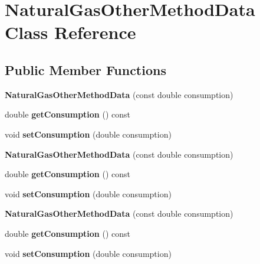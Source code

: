 \hypertarget{class_natural_gas_other_method_data}{}\section{Natural\+Gas\+Other\+Method\+Data Class Reference}
\label{class_natural_gas_other_method_data}
\subsection*{Public Member Functions}
\begin{DoxyCompactItemize}
\item 
\mbox{\label{class_natural_gas_other_method_data_a4f8900809b13ad64b7d67638e5d671a0}} 
{\bfseries Natural\+Gas\+Other\+Method\+Data} (const double consumption)
\item 
\mbox{\label{class_natural_gas_other_method_data_acbe484318bc5c104a7de9361b7930a84}} 
double {\bfseries get\+Consumption} () const
\item 
\mbox{\label{class_natural_gas_other_method_data_a9ca02c802cfa36f72a99dbc62fbc60bb}} 
void {\bfseries set\+Consumption} (double consumption)
\item 
\mbox{\label{class_natural_gas_other_method_data_a4f8900809b13ad64b7d67638e5d671a0}} 
{\bfseries Natural\+Gas\+Other\+Method\+Data} (const double consumption)
\item 
\mbox{\label{class_natural_gas_other_method_data_acbe484318bc5c104a7de9361b7930a84}} 
double {\bfseries get\+Consumption} () const
\item 
\mbox{\label{class_natural_gas_other_method_data_a9ca02c802cfa36f72a99dbc62fbc60bb}} 
void {\bfseries set\+Consumption} (double consumption)
\item 
\mbox{\label{class_natural_gas_other_method_data_a4f8900809b13ad64b7d67638e5d671a0}} 
{\bfseries Natural\+Gas\+Other\+Method\+Data} (const double consumption)
\item 
\mbox{\label{class_natural_gas_other_method_data_acbe484318bc5c104a7de9361b7930a84}} 
double {\bfseries get\+Consumption} () const
\item 
\mbox{\label{class_natural_gas_other_method_data_a9ca02c802cfa36f72a99dbc62fbc60bb}} 
void {\bfseries set\+Consumption} (double consumption)
\end{DoxyCompactItemize}


